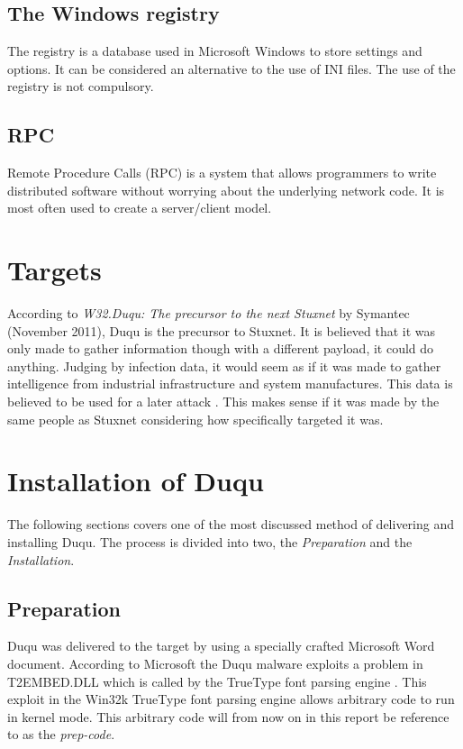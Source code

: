 \documentclass[11pt,english,a4paper]{report}
\begin{document}
\section{The Windows registry}
The registry is a database used in Microsoft Windows to store settings and options. It can be considered an alternative to the use of INI files. The use of the registry is not compulsory.

\section{RPC}
Remote Procedure Calls (RPC) is a system that allows programmers to write distributed software without worrying about the underlying network code. It is most often used to create a server/client model. \cite{MSRPC}

\chapter{Targets}
According to \textit{W32.Duqu: The precursor to the next Stuxnet}\cite{DUQU_SYMANTEC} by Symantec (November 2011), Duqu is the precursor to Stuxnet. It is believed that it was only made to gather information though with a different payload, it could do anything. Judging by infection data, it would seem as if it was made to gather intelligence from industrial infrastructure and system manufactures. This data is believed to be used for a later attack \cite{DUQU_SYMANTEC}. This makes sense if it was made by the same people as Stuxnet considering how specifically targeted it was. 

\chapter{Installation of Duqu}
The following sections covers one of the most discussed method of delivering and installing Duqu. The process is divided into two, the \textit{Preparation} and the \textit{Installation}.

\section{Preparation}
Duqu was delivered to the target by using a specially crafted Microsoft Word document. According to Microsoft the Duqu malware exploits a problem in T2EMBED.DLL which is called by the TrueType font parsing engine \cite{RYAN_ZDNET}. This exploit in the Win32k TrueType font parsing engine allows arbitrary code to run in kernel mode. This arbitrary code will from now on in this report be reference to as the \textit{prep-code}. 
\end{document}
